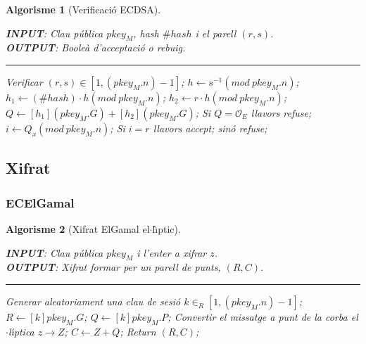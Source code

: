 \documentclass{beamer}
\def\lgem{l\ensuremath{\cdot}l}
\def\ce{corba e\lgem{}\'{\i}ptica}%
\theoremstyle{saltolinea}   			%
\newtheorem{algo}{Algorisme}
\begin{document}
\begin{frame}
  \begin{algo}[Verificaci\'o ECDSA]\label{alg:ECDSA_verif}
    \parbox[b]{\linewidth}{%
      {\bf INPUT}: Clau p\'ublica $pkey_{M}$, hash $\#hash$ i el parell $\left(r,s\right)$.\\
      {\bf OUTPUT}: Boole\`a d'acceptaci\'o o rebuig.
      \hrule
    }%
    \vspace{-7mm}
    \begin{algorithmic}[1]
      \STATE Verificar $\left(r,s\right)\in\left[1,\left(pkey_{M}.n\right)-1\right]$;
      \STATE $h\leftarrow s^{-1}\left(mod\: pkey_{M}.n\right)$;
      \STATE $h_{1}\leftarrow\left(\# hash\right)\cdot h\left(mod\: pkey_{M}.n\right)$;
      \STATE $h_{2}\leftarrow r\cdot h\left(mod\: pkey_{M}.n\right)$;
      \STATE \alert<2>{$Q\leftarrow \left[h_{1}\right]\left(pkey_{M}.G\right)+\left[h_{2}\right]\left(pkey_{M}.G\right)$;}
      \STATE Si $Q=\mathcal{O}_{E}$ llavors refuse;
      \STATE $i\leftarrow Q_{x}\left(mod\: pkey_{M}.n\right)$;
      \STATE Si $i=r$ llavors accept; sin\'o refuse;
    \end{algorithmic}
  \end{algo}%
\end{frame}

\subsection{Xifrat}

\subsubsection{ECElGamal}

\begin{frame}
  \begin{algo}[Xifrat ElGamal el$\cdot$l\`{\i}ptic]\label{alg:ECElGamal}
    \parbox[b]{\linewidth}{%
      {\bf INPUT}: Clau p\'ublica $pkey_{M}$ i l'enter a xifrar $z$.\\
      {\bf OUTPUT}: Xifrat formar per un parell de punts, $(R,C)$.
      \hrule
    }%
    \vspace{-7mm}
    \begin{algorithmic}[1]
      \STATE Generar aleatoriament una clau de sesi\'o $k\in_{R}\left[1,\left(pkey_{M}.n\right)-1\right]$;
      \STATE \alert<2>{$R \leftarrow \left[k\right] pkey_{M}.G$;}
      \STATE \alert<3>{$Q \leftarrow \left[k\right] pkey_{M}.P$;} \alert<4>{}
      \STATE \alert<5>{Convertir el missatge a punt de la \ce{} $z\rightarrow Z$;}
      \STATE $C \leftarrow Z+Q$;\label{alg:ECElGamal:suma}
      \STATE Return $(R,C)$;
    \end{algorithmic}
  \end{algo}
\end{frame}
\end{document}
